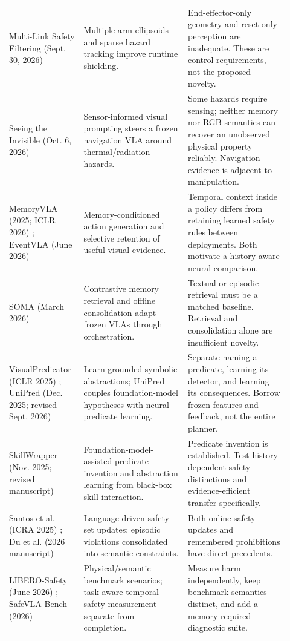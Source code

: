 \documentclass[10pt]{article}
\begin{document}
\begin{longtable}{p{0.23\linewidth}p{0.35\linewidth}p{0.34\linewidth}}
Multi-Link Safety Filtering (Sept. 30, 2026) \cite{multilink} & Multiple arm ellipsoids and sparse hazard tracking improve runtime shielding. & End-effector-only geometry and reset-only perception are inadequate. These are control requirements, not the proposed novelty.\\
Seeing the Invisible (Oct. 6, 2026) \cite{invisible} & Sensor-informed visual prompting steers a frozen navigation VLA around thermal/radiation hazards. & Some hazards require sensing; neither memory nor RGB semantics can recover an unobserved physical property reliably. Navigation evidence is adjacent to manipulation.\\
MemoryVLA (2025; ICLR 2026) \cite{memoryvla}; EventVLA (June 2026) \cite{eventvla} & Memory-conditioned action generation and selective retention of useful visual evidence. & Temporal context inside a policy differs from retaining learned safety rules between deployments. Both motivate a history-aware neural comparison.\\
SOMA (March 2026) \cite{soma} & Contrastive memory retrieval and offline consolidation adapt frozen VLAs through orchestration. & Textual or episodic retrieval must be a matched baseline. Retrieval and consolidation alone are insufficient novelty.\\
VisualPredicator (ICLR 2025) \cite{visualpred}; UniPred (Dec. 2025; revised Sept. 2026) \cite{unipred} & Learn grounded symbolic abstractions; UniPred couples foundation-model hypotheses with neural predicate learning. & Separate naming a predicate, learning its detector, and learning its consequences. Borrow frozen features and feedback, not the entire planner.\\
SkillWrapper (Nov. 2025; revised manuscript) \cite{skillwrapper} & Foundation-model-assisted predicate invention and abstraction learning from black-box skill interaction. & Predicate invention is established. Test history-dependent safety distinctions and evidence-efficient transfer specifically.\\
Santos et al. (ICRA 2025) \cite{feedback}; Du et al. (2026 manuscript) \cite{episodic} & Language-driven safety-set updates; episodic violations consolidated into semantic constraints. & Both online safety updates and remembered prohibitions have direct precedents.\\
LIBERO-Safety (June 2026) \cite{libsafe}; SafeVLA-Bench (2026) \cite{safebench} & Physical/semantic benchmark scenarios; task-aware temporal safety measurement separate from completion. & Measure harm independently, keep benchmark semantics distinct, and add a memory-required diagnostic suite.\\
\bottomrule
\end{longtable}
\normalsize
\end{document}
